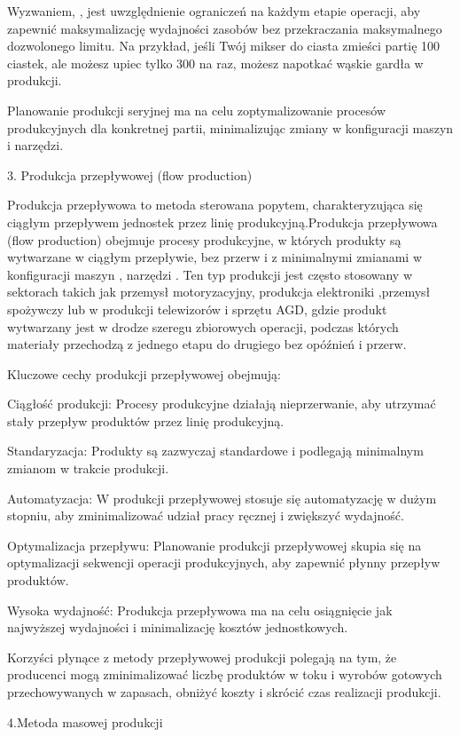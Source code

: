 Wyzwaniem, , jest uwzględnienie ograniczeń na każdym etapie operacji, aby zapewnić maksymalizację wydajności zasobów bez przekraczania maksymalnego dozwolonego limitu. Na przykład, jeśli Twój mikser do ciasta zmieści partię 100 ciastek, ale możesz upiec tylko 300 na raz, możesz napotkać wąskie gardła w produkcji.

Planowanie produkcji seryjnej ma na celu zoptymalizowanie procesów produkcyjnych dla konkretnej partii, minimalizując zmiany w konfiguracji maszyn i narzędzi.
    
3. Produkcja przepływowej (flow production)

Produkcja przepływowa to metoda sterowana popytem, charakteryzująca się ciągłym przepływem jednostek przez linię produkcyjną.Produkcja przepływowa (flow production) obejmuje procesy produkcyjne, w których produkty są wytwarzane w ciągłym przepływie, bez przerw i z minimalnymi zmianami w konfiguracji maszyn , narzędzi . Ten typ produkcji jest często stosowany w sektorach takich jak przemysł motoryzacyjny, produkcja elektroniki ,przemysł spożywczy lub w produkcji telewizorów i sprzętu AGD, gdzie produkt wytwarzany jest w drodze szeregu zbiorowych operacji, podczas których materiały przechodzą z jednego etapu do drugiego bez opóźnień i przerw.

Kluczowe cechy produkcji przepływowej obejmują:

    Ciągłość produkcji: Procesy produkcyjne działają nieprzerwanie, aby utrzymać stały przepływ produktów przez linię produkcyjną.

    Standaryzacja: Produkty są zazwyczaj standardowe i podlegają minimalnym zmianom w trakcie produkcji.

    Automatyzacja: W produkcji przepływowej stosuje się automatyzację w dużym stopniu, aby zminimalizować udział pracy ręcznej i zwiększyć wydajność.

    Optymalizacja przepływu: Planowanie produkcji przepływowej skupia się na optymalizacji sekwencji operacji produkcyjnych, aby zapewnić płynny przepływ produktów.

    Wysoka wydajność: Produkcja przepływowa ma na celu osiągnięcie jak najwyższej wydajności i minimalizację kosztów jednostkowych.

    
Korzyści płynące z metody przepływowej produkcji polegają na tym, że producenci mogą zminimalizować liczbę produktów w toku i wyrobów gotowych przechowywanych w zapasach, obniżyć koszty i skrócić czas realizacji produkcji.

4.Metoda masowej produkcji

